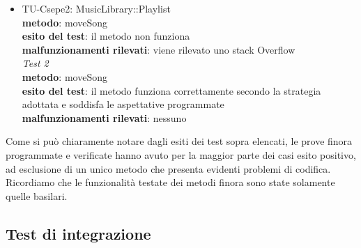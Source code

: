 \begin{itemize}
 
 \item TU-Csepe2: MusicLibrary::Playlist\\
 \textbf{metodo}: moveSong\\
 \textbf{esito del test}: il metodo non funziona\\
 \textbf{malfunzionamenti rilevati}: viene rilevato uno stack Overflow\\
 
 \emph{Test 2}\\
 \textbf{metodo}: moveSong\\
 \textbf{esito del test}: il metodo funziona correttamente secondo la strategia
  adottata e soddisfa le aspettative programmate\\
 \textbf{malfunzionamenti rilevati}: nessuno\\
  
  
\end{itemize}  

Come si pu\`o chiaramente notare dagli esiti dei test sopra elencati, le prove
finora programmate e verificate hanno avuto per la maggior parte dei
casi esito positivo, ad esclusione di un unico metodo che presenta evidenti
problemi di codifica. Ricordiamo che le funzionalit\`a testate dei metodi finora 
sono state solamente quelle basilari.
  
\subsection{Test di integrazione}

